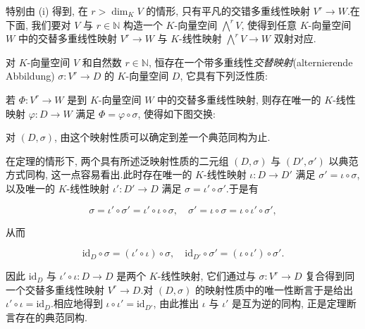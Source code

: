特别由 (i) 得到, 在 $r > \dim_K V$ 的情形, 只有平凡的交错多重线性映射 $V^r \longrightarrow W$.在下面, 我们要对 $V$ 与 $r \in \mathbb{N}$ 构造一个 $K$-向量空间 $\bigwedge^r V$, 使得到任意 $K$-向量空间 $W$ 中的交替多重线性映射 $V^r \longrightarrow W$ 与 $K$-线性映射 $\bigwedge^r V \longrightarrow W$ 双射对应.

\begin{theorem}[外积的泛性质]\label{thm:4.5.2}
对 $K$-向量空间 $V$ 和自然数 $r \in \mathbb{N}$, 恒存在一个带多重线性\emph{交替映射}(\textup{alternierende Abbildung}) $\sigma \colon V^r \longrightarrow D$ 的 $K$-向量空间 $D$, 它具有下列泛性质:

若 $\Phi \colon V^r \longrightarrow W$ 是到 $K$-向量空间 $W$ 中的交替多重线性映射, 则存在唯一的 $K$-线性映射 $\varphi \colon D \longrightarrow W$ 满足 $\Phi = \varphi \circ \sigma$, 使得如下图交换:

\begin{center}
\end{center}

对 $(D, \sigma)$, 由这个映射性质可以确定到差一个典范同构为止.
\end{theorem}

在定理的情形下, 两个具有所述泛映射性质的二元组 $(D, \sigma)$ 与 $(D', \sigma')$ 以典范方式同构, 这一点容易看出.此时存在唯一的 $K$-线性映射 $\iota \colon D \longrightarrow D'$ 满足 $\sigma' = \iota \circ \sigma$, 以及唯一的 $K$-线性映射 $\iota' \colon D' \longrightarrow D$ 满足 $\sigma = \iota' \circ \sigma'$.于是有

\[
\sigma = \iota' \circ \sigma' = \iota' \circ \iota \circ \sigma, \quad \sigma' = \iota \circ \sigma = \iota \circ \iota' \circ \sigma',
\]

从而

\[
\mathrm{id}_D \circ \sigma = (\iota' \circ \iota) \circ \sigma, \quad \mathrm{id}_{D'} \circ \sigma' = (\iota \circ \iota') \circ \sigma'.
\]

因此 $\mathrm{id}_D$ 与 $\iota' \circ \iota \colon D \longrightarrow D$ 是两个 $K$-线性映射, 它们通过与 $\sigma \colon V^r \longrightarrow D$ 复合得到同一个交替多重线性映射 $V^r \longrightarrow D$.对 $(D, \sigma)$ 的映射性质中的唯一性断言于是给出 $\iota' \circ \iota = \mathrm{id}_D$.相应地得到 $\iota \circ \iota' = \mathrm{id}_{D'}$, 由此推出 $\iota$ 与 $\iota'$ 是互为逆的同构, 正是定理断言存在的典范同构.

